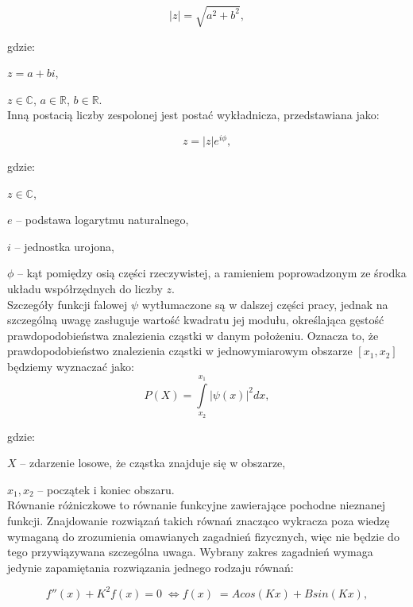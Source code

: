 \documentclass{SGGW-thesis}
\begin{document}
	\begin{equation}
	|z| = \sqrt{a^2+b^2},
	\end{equation}
	
	gdzie:
	
	$ z = a + bi$,
	
	$z \in \mathbb{C}$,
	$a \in \mathbb{R}$,
	$b \in \mathbb{R}$.\\
	
	Inną postacią liczby zespolonej jest postać wykładnicza, przedstawiana jako:
	
	\begin{equation}
	z = |z|e^{i\phi},
	\end{equation}
	
	gdzie:
	
	$z \in \mathbb{C}$,
	
	$e$ -- podstawa logarytmu naturalnego,
	
	$i$ -- jednostka urojona,
	
	$\phi$ -- kąt pomiędzy osią części rzeczywistej, a ramieniem poprowadzonym ze środka układu współrzędnych do liczby $z$.\\
	
	Szczegóły funkcji falowej $\psi$ wytłumaczone są w dalszej części pracy, jednak na szczególną uwagę zasługuje wartość kwadratu jej modułu, określająca gęstość prawdopodobieństwa znalezienia cząstki w danym położeniu. Oznacza to, że prawdopodobieństwo znalezienia cząstki w jednowymiarowym obszarze $[x_1, x_2]$ będziemy wyznaczać jako:
	\begin{equation}
	P(X) = \int\limits_{x_2}^{x_1} |\psi(x)|^2dx,
	\end{equation}
	
	gdzie:
	
	$X$ -- zdarzenie losowe, że cząstka znajduje się w obszarze,
	
	$x_1, x_2$ -- początek i koniec obszaru.\\ 	
	
	Równanie różniczkowe to równanie funkcyjne zawierające pochodne nieznanej funkcji. Znajdowanie rozwiązań takich równań znacząco wykracza poza wiedzę wymaganą do zrozumienia omawianych zagadnień fizycznych, więc nie będzie do tego przywiązywana szczególna uwaga. Wybrany zakres zagadnień wymaga jedynie zapamiętania rozwiązania jednego rodzaju równań:
	
	\begin{equation}
	f''(x)+K^2f(x)=0 \;\Longleftrightarrow f(x)\; = Acos(Kx) + Bsin(Kx),
	\end{equation}
\end{document}

